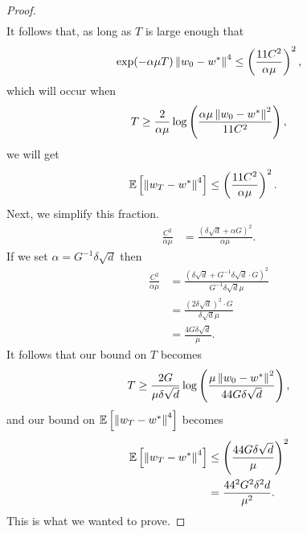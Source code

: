 \begin{proof}
\begin{align*}
\end{align*}
It follows that, as long as $T$ is large enough that
\[
  \exp(- \alpha \mu T) \left\| w_0 - w^* \right\|^4 \le \left( \frac{11 C^2}{\alpha \mu} \right)^2,
\]
which will occur when
\[
  T \ge \frac{2}{\alpha \mu} \log\left( \frac{\alpha \mu \left\| w_0 - w^* \right\|^2}{11 C^2} \right),
\]
we will get 
\begin{align*}
  \mathbb{E}\left[  \left\| w_T - w^* \right\|^4  \right]
  &\le
  \left( \frac{11 C^2}{\alpha \mu} \right)^2.
\end{align*}
Next, we simplify this fraction.
\begin{align*}
  \frac{C^2}{\alpha \mu}
  &=
  \frac{\left( \delta \sqrt{d} + \alpha G \right)^2}{\alpha \mu}.
\end{align*}
If we set $\alpha = G^{-1} \delta \sqrt{d}$ then
\begin{align*}
  \frac{C^2}{\alpha \mu}
  &=
  \frac{\left( \delta \sqrt{d} + G^{-1} \delta \sqrt{d} \cdot G \right)^2}{G^{-1} \delta \sqrt{d} \mu} \\
  &=
  \frac{\left( 2 \delta \sqrt{d} \right)^2 \cdot G}{\delta \sqrt{d} \mu} \\
  &=
  \frac{4 G \delta \sqrt{d}}{\mu}.
\end{align*}
It follows that our bound on $T$ becomes
\[
  T \ge \frac{2 G}{\mu \delta \sqrt{d}} \log\left( \frac{\mu \left\| w_0 - w^* \right\|^2}{44 G \delta \sqrt{d}} \right),
\]
and our bound on $\mathbb{E}\left[  \left\| w_T - w^* \right\|^4  \right]$ becomes
\begin{align*}
  \mathbb{E}\left[  \left\| w_T - w^* \right\|^4  \right]
  &\le
  \left( \frac{44 G \delta \sqrt{d}}{\mu} \right)^2 \\
  &=
  \frac{44^2 G^2 \delta^2 d}{\mu^2}.
\end{align*}
This is what we wanted to prove.
\end{proof}

\newpage
